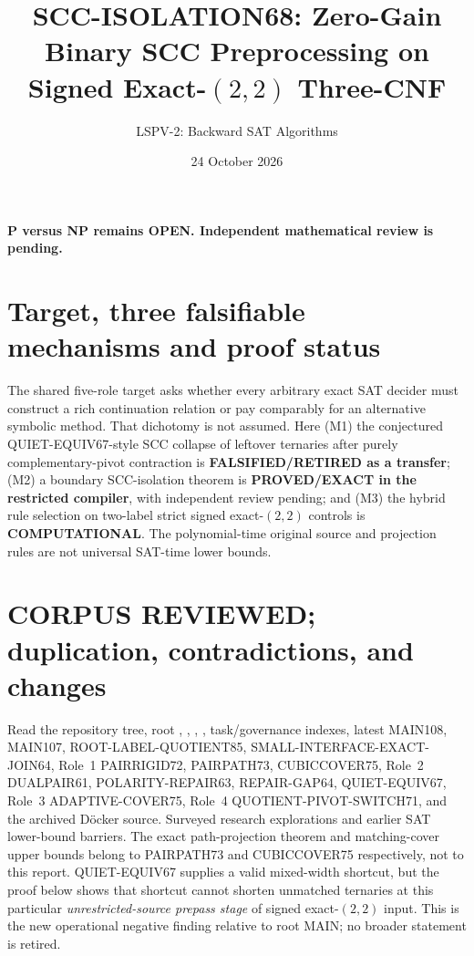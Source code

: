 \documentclass[11pt]{article}
\title{SCC-ISOLATION68: Zero-Gain Binary SCC Preprocessing on Signed Exact-$(2,2)$ Three-CNF}
\author{LSPV-2: Backward SAT Algorithms}
\date{24 October 2026}
\begin{document}
\maketitle
\begin{center}\textbf{P versus NP remains OPEN. Independent mathematical review is pending.}\end{center}

\section{Target, three falsifiable mechanisms and proof status}
The shared five-role target asks whether every arbitrary exact SAT decider must construct a rich continuation relation or pay comparably for an alternative symbolic method. That dichotomy is not assumed. Here (M1) the conjectured QUIET-EQUIV67-style SCC collapse of leftover ternaries after purely complementary-pivot contraction is \textbf{FALSIFIED/RETIRED as a transfer}; (M2) a boundary SCC-isolation theorem is \textbf{PROVED/EXACT in the restricted compiler}, with independent review pending; and (M3) the hybrid rule selection on two-label strict signed exact-$(2,2)$ controls is \textbf{COMPUTATIONAL}. The polynomial-time original source and projection rules are not universal SAT-time lower bounds.

\section{CORPUS REVIEWED; duplication, contradictions, and changes}
Read the repository tree, root , , , , task/governance indexes, latest MAIN108, MAIN107, ROOT-LABEL-QUOTIENT85, SMALL-INTERFACE-EXACT-JOIN64, Role~1 PAIRRIGID72, PAIRPATH73, CUBICCOVER75, Role~2 DUALPAIR61, POLARITY-REPAIR63, REPAIR-GAP64, QUIET-EQUIV67, Role~3 ADAPTIVE-COVER75, Role~4 QUOTIENT-PIVOT-SWITCH71, and the archived D\"ocker source. Surveyed research explorations and earlier SAT lower-bound barriers. The exact path-projection theorem and matching-cover upper bounds belong to PAIRPATH73 and CUBICCOVER75 respectively, not to this report. QUIET-EQUIV67 supplies a valid mixed-width shortcut, but the proof below shows that shortcut cannot shorten unmatched ternaries at this particular \emph{unrestricted-source prepass stage} of signed exact-$(2,2)$ input. This is the new operational negative finding relative to root MAIN; no broader statement is retired.
\end{document}

